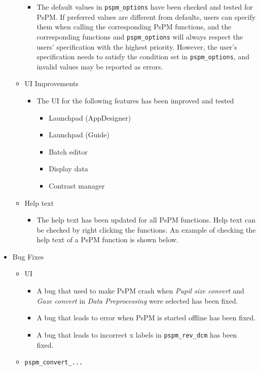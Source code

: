 \documentclass[english]{article}
\numberwithin{equation}{section}
\numberwithin{figure}{section}
\begin{document}
\begin{itemize}
\begin{itemize}
\begin{itemize}
			\item The default values in \texttt{pspm\_options} have been checked and tested for PsPM. If preferred values are different from defaults, users can specify them when calling the corresponding PsPM functions, and the corresponding functions and \texttt{pspm\_options} will always respect the users' specification with the highest priority. However, the user's specification needs to satisfy the condition set in \texttt{pspm\_options}, and invalid values may be reported as errors.
		\end{itemize}
		\item UI Improvements
		\begin{itemize}
			\item The UI for the following features has been improved and tested
			\begin{itemize}
				\item Launchpad (AppDesigner)
				\item Launchpad (Guide)
				\item Batch editor
				\item Display data
				\item Contrast manager
			\end{itemize}
		\end{itemize}
		\item Help text
		\begin{itemize}
			\item The help text has been updated for all PsPM functions. Help text can be checked by right clicking the functions. An example of checking the help text of a PsPM function is shown below.
		\end{itemize}
	\end{itemize}
	\item Bug Fixes
	\begin{itemize}
		\item UI
		\begin{itemize}
			\item A bug that used to make PsPM crash when \textit{Pupil size convert} and \textit{Gaze convert} in \textit{Data Preprocessing} were selected has been fixed.
			\item A bug that leads to error when PsPM is started offline has been fixed.
			\item A bug that leads to incorrect x labels in \texttt{pspm\_rev\_dcm} has been fixed.
		\end{itemize}
		\item \texttt{pspm\_convert\_...}
		\begin{itemize}

\end{itemize}
\end{itemize}
\end{itemize}
\end{document}
